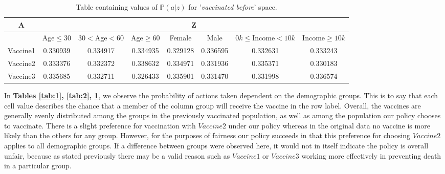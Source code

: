 \documentclass{article}
\begin{document}
\begin{center}
\begin{table}[H]
\begin{adjustbox}{max width=\textwidth}
\begin{tabular}{ |c| c c c c c c c|}
\hline
A  & \multicolumn{7}{c|}{Z} \\
\hline
  & Age$\leq30$ &    $30<$Age$<60$ &     Age$\geq60$ &    Female &      Male &   $0k\leq$Income$<10k$ &    Income$\geq10k$ \\
\hline
Vaccine1 &  0.330939 &  0.334917 &  0.334935 &  0.329128 &  0.336595 &  0.332631 &  0.333243 \\
Vaccine2 &  0.333376 &  0.332372 &  0.338632 &  0.334971 &  0.331936 &  0.335371 &  0.330183 \\
Vaccine3 &  0.335685 &  0.332711 &  0.326433 &  0.335901 &  0.331470 &  0.331998 &  0.336574
  \\ \hline
\end{tabular}
\end{adjustbox}
\caption{Table containing values of $\mathbb{P}(a|z)$ for '\textit{vaccinated before}' space.}
\label{tab:3}
\end{table}
\end{center}

In \textbf{Tables \ref{tab:1}, \ref{tab:2}, \ref{tab:3}}, we observe the probability of actions taken dependent on the demographic groups. This is to say that each cell value describes the chance that a member of the column group will receive the vaccine in the row label. Overall, the vaccines are generally evenly distributed among the groups in the previously vaccinated population, as well as among the population our policy chooses to vaccinate. There is a slight preference for vaccination with $Vaccine2$ under our policy whereas in the original data no vaccine is more likely than the others for any group. However, for the purposes of fairness our policy succeeds in that this preference for choosing $Vaccine2$ applies to all demographic groups. If a difference between groups were observed here, it would not in itself indicate the policy is overall unfair, because as stated previously there may be a valid reason such as $Vaccine1$ or $Vaccine3$ working more effectively in preventing death in a particular group.
\end{document}
